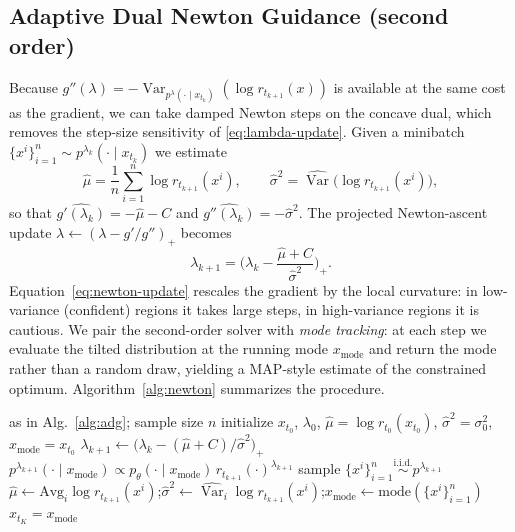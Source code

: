 \documentclass{article}
\DeclareMathOperator{\Var}{Var}
\newcommand{\qlam}{p^{\lambda}(\cdot\mid x_{t_k})}
\begin{document}
\subsection{Adaptive Dual Newton Guidance (second order)}
Because $g''(\lambda)=-\Var_{\qlam}(\log r_{t_{k+1}}(x))$ is available at the same cost as the gradient, we can take damped Newton steps on the concave dual, which removes the step-size sensitivity of \eqref{eq:lambda-update}. Given a minibatch $\{x^i\}_{i=1}^n\sim p^{\lambda_k}(\cdot\mid x_{t_k})$ we estimate
\begin{equation}
\widehat\mu=\frac1n\sum_{i=1}^n\log r_{t_{k+1}}(x^i),
\qquad
\widehat\sigma^2=\widehat{\Var}\big(\log r_{t_{k+1}}(x^i)\big),
\end{equation}
so that $\widehat{g'(\lambda_k)}=-\widehat\mu-C$ and $\widehat{g''(\lambda_k)}=-\widehat\sigma^2$. The projected Newton-ascent update $\lambda\!\leftarrow\!(\lambda-g'/g'')_+$ becomes
\begin{equation}
\label{eq:newton-update}
\lambda_{k+1}=\Big(\lambda_k-\frac{\widehat\mu+C}{\widehat\sigma^2}\Big)_{+}.
\end{equation}
Equation~\eqref{eq:newton-update} rescales the gradient by the local curvature: in low-variance (confident) regions it takes large steps, in high-variance regions it is cautious. We pair the second-order solver with \emph{mode tracking}: at each step we evaluate the tilted distribution at the running mode $x_{\mathrm{mode}}$ and return the mode rather than a random draw, yielding a MAP-style estimate of the constrained optimum. Algorithm~\ref{alg:newton} summarizes the procedure.

\begin{algorithm}[t]
\caption{Adaptive Dual Newton Guidance}
\label{alg:newton}
\begin{algorithmic}[1]
\Require as in Alg.~\ref{alg:adg}; sample size $n$
\State initialize $x_{t_0}$, $\lambda_0$, $\widehat\mu=\log r_{t_0}(x_{t_0})$, $\widehat\sigma^2=\sigma_0^2$, $x_{\mathrm{mode}}=x_{t_0}$
  \State $\lambda_{k+1}\gets\big(\lambda_k-(\widehat\mu+C)/\widehat\sigma^2\big)_+$ 
  \State $p^{\lambda_{k+1}}(\cdot\mid x_{\mathrm{mode}})\propto p_\theta(\cdot\mid x_{\mathrm{mode}})\,r_{t_{k+1}}(\cdot)^{\lambda_{k+1}}$
  \State sample $\{x^i\}_{i=1}^n\stackrel{\text{i.i.d.}}{\sim}p^{\lambda_{k+1}}$
  \State $\widehat\mu\gets\mathrm{Avg}_i\log r_{t_{k+1}}(x^i)$;\quad $\widehat\sigma^2\gets\widehat{\Var}_i\log r_{t_{k+1}}(x^i)$;\quad $x_{\mathrm{mode}}\gets\mathrm{mode}(\{x^i\}_{i=1}^n)$
\EndFor
\State \Return $x_{t_K}=x_{\mathrm{mode}}$
\end{algorithmic}
\end{algorithm}
\end{document}
